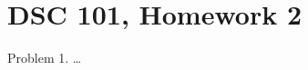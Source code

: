 \documentclass{article}
\begin{document}
\section*{DSC 101, Homework 2}
Problem 1. \dots
\end{document}
